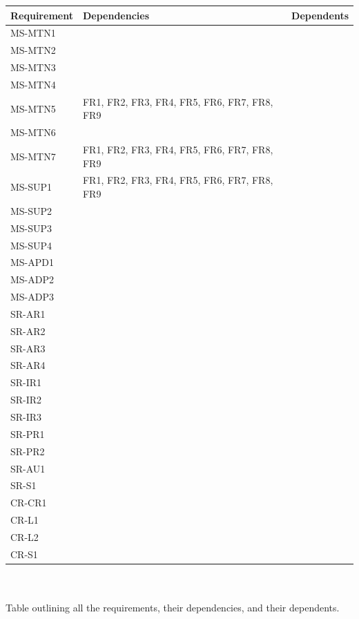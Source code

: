 \documentclass[12pt]{article}
\begin{document}
\begin{tabular}{|p{3cm}|p{3cm}|p{8cm}|}
\hline
\textbf{Requirement} & \textbf{Dependencies} & \textbf{Dependents}\\
\hline
MS-MTN1& & \\
MS-MTN2& & \\
MS-MTN3& & \\
MS-MTN4& & \\
MS-MTN5& FR1, FR2, FR3, FR4, FR5, FR6, FR7, FR8, FR9& \\
MS-MTN6& & \\
MS-MTN7& FR1, FR2, FR3, FR4, FR5, FR6, FR7, FR8, FR9& \\
MS-SUP1& FR1, FR2, FR3, FR4, FR5, FR6, FR7, FR8, FR9& \\
MS-SUP2& & \\
MS-SUP3& & \\
MS-SUP4& & \\
MS-APD1& & \\
MS-ADP2& & \\
MS-ADP3& & \\
SR-AR1& & \\
SR-AR2& & \\
SR-AR3& & \\
SR-AR4& & \\
SR-IR1& & \\
SR-IR2& & \\
SR-IR3& & \\
SR-PR1& & \\
SR-PR2& & \\
SR-AU1& & \\
SR-S1& & \\
CR-CR1& & \\
CR-L1& & \\
CR-L2& & \\
CR-S1& & \\
\hline
\end{tabular}
\\
\\
Table outlining all the requirements, their dependencies, and their dependents.
\end{document}
